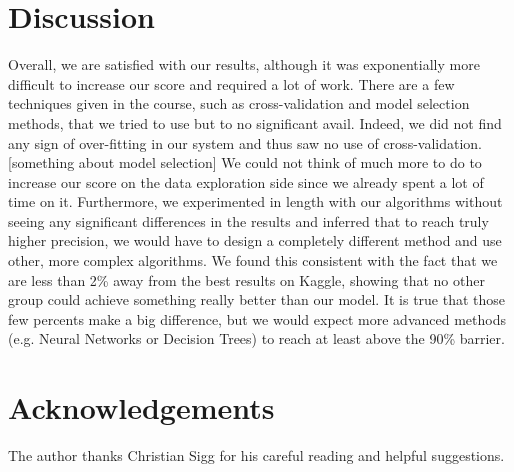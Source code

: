 \documentclass[10pt,conference,compsocconf]{IEEEtran}
\begin{document}
\section{Discussion}
Overall, we are satisfied with our results, although it was exponentially more difficult to increase our score and required a lot of work. There are a few techniques given in the course, such as cross-validation and model selection methods, that we tried to use but to no significant avail. Indeed, we did not find any sign of over-fitting in our system and thus saw no use of cross-validation.
[something about model selection]
We could not think of much more to do to increase our score on the data exploration side since we already spent a lot of time on it. Furthermore, we experimented in length with our algorithms without seeing any significant differences in the results and inferred that to reach truly higher precision, we would have to design a completely different method and use other, more complex algorithms. We found this consistent with the fact that we are less than 2\% away from the best results on Kaggle, showing that no other group could achieve something really better than our model. It is true that those few percents make a big difference, but we would expect more advanced methods (e.g. Neural Networks or Decision Trees) to reach at least above the 90\% barrier. 


\section*{Acknowledgements}
The author thanks Christian Sigg for his careful reading and helpful
suggestions.



\end{document}
